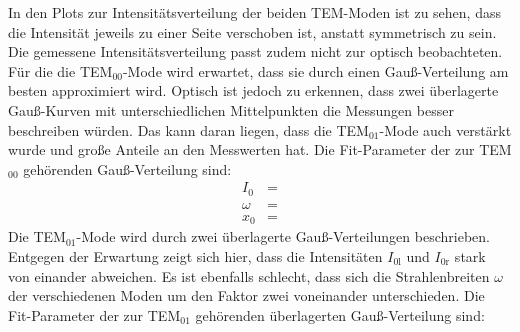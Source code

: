 In den Plots zur Intensitätsverteilung der beiden TEM-Moden ist zu sehen, dass die Intensität jeweils zu einer Seite verschoben ist, anstatt symmetrisch zu sein. Die gemessene Intensitätsverteilung passt zudem nicht zur optisch beobachteten. \\ 
Für die die TEM$_{00}$-Mode wird erwartet, dass sie durch einen Gauß-Verteilung am besten approximiert wird. Optisch ist jedoch zu erkennen, dass zwei überlagerte Gauß-Kurven mit unterschiedlichen Mittelpunkten die Messungen besser beschreiben würden. Das kann daran liegen, dass die TEM$_{01}$-Mode auch verstärkt wurde und große Anteile an den Messwerten hat. Die Fit-Parameter der zur TEM$_{00}$ gehörenden Gauß-Verteilung sind:
\begin{align*}
	I_0 &=  \\
	\omega &=   \\
	x_0 &= 
\end{align*}
Die TEM$_{01}$-Mode wird durch zwei überlagerte Gauß-Verteilungen beschrieben. Entgegen der Erwartung zeigt sich hier, dass die Intensitäten $	I_\text{0l} $ und $I_\text{0r}$ stark von einander abweichen. Es ist ebenfalls schlecht, dass sich die Strahlenbreiten $\omega$ der verschiedenen Moden um den Faktor zwei voneinander unterschieden. Die Fit-Parameter der zur TEM$_{01}$ gehörenden überlagerten Gauß-Verteilung sind:

